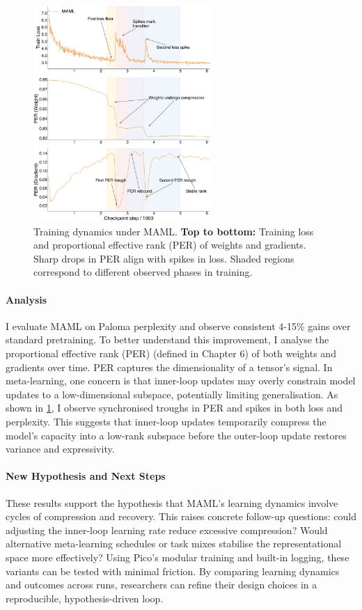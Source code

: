 \begin{figure}[h!]
    \centering
    \includegraphics[width=0.6\textwidth]{chapters/pico/figures/maml-example.pdf}
    \caption{Training dynamics under MAML.
    \textbf{Top to bottom:} Training loss and proportional effective rank (PER) of weights and gradients.
    Sharp drops in PER align with spikes in loss. Shaded regions correspond to different observed phases in training. 
    }
    \label{fig:maml_example}
\end{figure}


\paragraph{Analysis} I evaluate MAML on Paloma perplexity and observe consistent 4-15\% gains over standard pretraining. To better understand this improvement, I analyse the proportional effective rank (PER) (defined in Chapter 6) of both weights and gradients over time. PER captures the dimensionality of a tensor's signal. In meta-learning, one concern is that inner-loop updates may overly constrain model updates to a low-dimensional subspace, potentially limiting generalisation. As shown in \cref{fig:maml_example}, I observe synchronised troughs in PER and spikes in both loss and perplexity. This suggests that inner-loop updates temporarily compress the model's capacity into a low-rank subspace before the outer-loop update restores variance and expressivity.


\paragraph{New Hypothesis and Next Steps}
These results support the hypothesis that MAML's learning dynamics involve cycles of compression and recovery. This raises concrete follow-up questions: could adjusting the inner-loop learning rate reduce excessive compression? Would alternative meta-learning schedules or task mixes stabilise the representational space more effectively? Using Pico's modular training and built-in logging, these variants can be tested with minimal friction. By comparing learning dynamics and outcomes across runs, researchers can refine their design choices in a reproducible, hypothesis-driven loop.%

